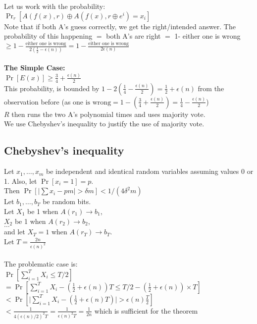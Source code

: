 Let us work with the probability: $\Pr_{r}[A(f(x), r) \oplus A(f(x), r \oplus e^i) = x_i]$\\
		Note that if both A's guess correctly, we get the right/intended answer.
		The probability of this happening $=$ both A's are right $=$ 1- either one is wrong $\ge  1-\frac{\text{either one is wrong}}{2 (\frac{1}{2}-\epsilon(n))} = 1 - \frac{\text{either one is wrong}}{2 \epsilon(n)}$\\\\
\textbf{The Simple Case:}\\
	$\Pr[E(x)] \ge \frac{3}{4}+\frac{\epsilon(n)}{2}$\\
	This probability, is bounded by $1-2(\frac{1}{4} - \frac{\epsilon(n)}{2}) = \frac{1}{2} + \epsilon(n)$ from the observation before (as $\text{one is wrong} = 1- (\frac{3}{4}+\frac{\epsilon(n)}{2}) = \frac{1}{4} - \frac{\epsilon(n)}{2}$)\\
	$R$ then runs the two A's polynomial times and uses majority vote.\\
	We use Chebyshev's inequality to justify the use of majority vote.

\subsection{Chebyshev's inequality} %
	Let $x_1,\ldots,x_m$ be independent and identical random variables assuming values 0 or 1.  Also, let $\Pr[x_i=1] = p$.\\
		Then $\Pr[ \lvert \sum x_i - pm \rvert > \delta m] < 1/(4\delta^2 m)$\\

	Let $b_1,\ldots,b_T$ be random bits.\\
	Let $X_1$ be 1 when $A(r_1) \rightarrow b_1$,\\
	$X_2$ be 1 when $A(r_2) \rightarrow b_2$,\\
	$\ldots$\\
	and let $X_T=1$ when $A(r_T) \rightarrow b_T$.\\
	Let $T=\frac{2n}{\epsilon(n)^2}$\\\\

The problematic case is:\\
	$\Pr[ \sum_{i=1}^T X_i \le T/2]$\\
	$= \Pr[ \sum_{i=1}^T X_i - (\frac{1}{2} + \epsilon(n)) T \le T/2 - (\frac{1}{2}+\epsilon(n))\times T]$\\
	$< \Pr[ \lvert \sum_{i=1}^T X_i - (\frac{1}{2}+\epsilon(n) T)\rvert > \epsilon(n) \frac{T}{2} ]$\\
	$< \frac{1}{4 (\epsilon(n)/2)^2 T} = \frac{1}{\epsilon(n)^2 T} = \frac{1}{2n}$ which is sufficient for the theorem\\\\

